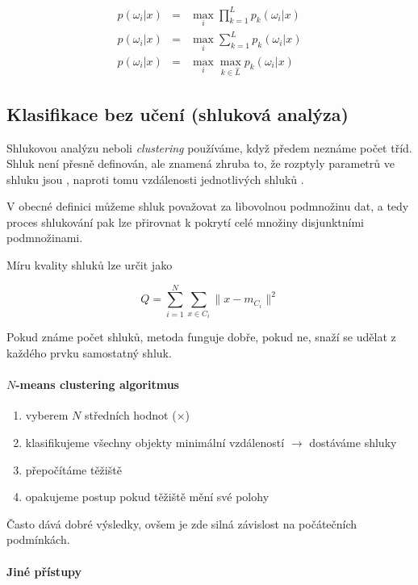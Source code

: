 \begin{eqnarray}
p(\omega_i|x)&=&\max\limits_i\prod\limits_{k=1}^L p_k(\omega_i|x)\\
p(\omega_i|x)&=&\max\limits_i \sum\limits_{k=1}^L p_k(\omega_i|x)\\
p(\omega_i|x)&=&\max\limits_i \max\limits_{k\in\hat{L}} p_k(\omega_i|x)
\end{eqnarray}

\subsection{Klasifikace bez učení (shluková analýza)}

Shlukovou analýzu neboli {\em clustering} používáme, když předem  neznáme počet tříd. Shluk není přesně definován,
ale znamená zhruba to, že rozptyly parametrů ve shluku jsou , naproti tomu vzdálenosti jednotlivých shluků
. 

V obecné definici můžeme shluk považovat za libovolnou podmnožinu dat, a tedy proces shlukování pak lze přirovnat k pokrytí
celé množiny disjunktními podmnožinami.

Míru kvality shluků lze určit jako

\begin{equation}
Q=\sum\limits_{i=1}^N\sum\limits_{x\in C_i}\|x-m_{C_i}\|^2
\end{equation}

Pokud známe počet shluků, metoda funguje dobře, pokud ne, snaží se udělat z každého prvku samostatný shluk.

\paragraph{$N$-means clustering algoritmus}
\begin{enumerate}
\item vyberem $N$ středních hodnot ($\times$)
\item klasifikujeme všechny objekty minimální vzdáleností $\rightarrow$ dostáváme shluky
\item přepočítáme těžiště
\item opakujeme postup pokud těžiště mění své polohy 
\end{enumerate}

Často dává dobré výsledky, ovšem je zde silná závislost na počátečních podmínkách.

\paragraph{Jiné přístupy}

